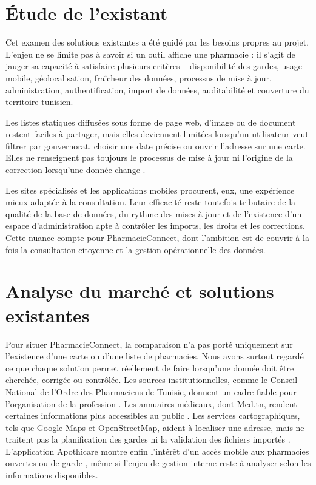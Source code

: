\section{Étude de l'existant}

Cet examen des solutions existantes a été guidé par les besoins propres au projet. L'enjeu ne se limite pas
à savoir si un outil affiche une pharmacie : il s'agit de jauger sa capacité à satisfaire plusieurs critères
-- disponibilité des gardes, usage mobile, géolocalisation, fraîcheur des données, processus de mise à jour,
administration, authentification, import de données, auditabilité et couverture du territoire tunisien.

Les listes statiques diffusées sous forme de page web, d'image ou de document restent faciles à partager,
mais elles deviennent limitées lorsqu'un utilisateur veut filtrer par gouvernorat, choisir une date précise
ou ouvrir l'adresse sur une carte. Elles ne renseignent pas toujours le processus de mise à jour ni l'origine
de la correction lorsqu'une donnée change \cite{cnopt_tableau_garde,medtn}.

Les sites spécialisés et les applications mobiles procurent, eux, une expérience mieux adaptée à la
consultation. Leur efficacité reste toutefois tributaire de la qualité de la base de données, du rythme des
mises à jour et de l'existence d'un espace d'administration apte à contrôler les imports, les droits et les
corrections. Cette nuance compte pour PharmacieConnect, dont l'ambition est de couvrir à la fois la
consultation citoyenne et la gestion opérationnelle des données.

\section{Analyse du marché et solutions existantes}

Pour situer PharmacieConnect, la comparaison n'a pas porté uniquement sur l'existence d'une carte ou d'une
liste de pharmacies. Nous avons surtout regardé ce que chaque solution permet réellement de faire lorsqu'une
donnée doit être cherchée, corrigée ou contrôlée. Les sources institutionnelles, comme le Conseil National
de l'Ordre des Pharmaciens de Tunisie, donnent un cadre fiable pour l'organisation de la profession
\cite{cnopt}. Les annuaires médicaux, dont Med.tn, rendent certaines informations plus accessibles au public
\cite{medtn}. Les services cartographiques, tels que Google Maps et OpenStreetMap, aident à localiser une
adresse, mais ne traitent pas la planification des gardes ni la validation des fichiers importés
\cite{googlemaps,openstreetmap}. L'application Apothicare montre enfin l'intérêt d'un accès mobile aux
pharmacies ouvertes ou de garde \cite{apothicare}, même si l'enjeu de gestion interne reste à analyser selon
les informations disponibles.

